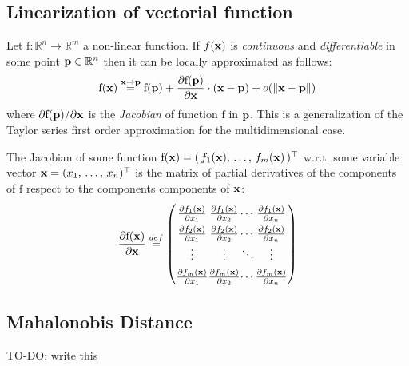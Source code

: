 	\subsection{Linearization of vectorial function}
		\label{app.jacobian}
		Let $\mathrm{f} : \mathbb{R}^n \rightarrow \mathbb{R}^m$ a non-linear function.
		If $f(\boldsymbol{\mathrm{{x}}})$ is \emph{continuous} and \emph{differentiable} in some point $\boldsymbol{\mathrm{{p}}} \in \mathbb{R}^n$ then it can be locally approximated as follows:
		\begin{equation}
			\mathrm{f}(\boldsymbol{\mathrm{{x}}}) \stackrel{\boldsymbol{\mathrm{{x}}} \rightarrow \boldsymbol{\mathrm{{p}}}}{=} \mathrm{f}(\boldsymbol{\mathrm{{p}}}) + \frac{\partial\mathrm{f}(\boldsymbol{\mathrm{{p}}})}{\partial\boldsymbol{\mathrm{{x}}}} \cdot (\boldsymbol{\mathrm{{x}}} - \boldsymbol{\mathrm{{p}}}) + o(\| \boldsymbol{\mathrm{{x}}} - \boldsymbol{\mathrm{{p}}} \|)
		\end{equation}
		where ${\partial\mathrm{f}(\boldsymbol{\mathrm{{p}}})}/{\partial\boldsymbol{\mathrm{{x}}}}$ is the \emph{Jacobian} of function $\mathrm{f}$ in $\boldsymbol{\mathrm{{p}}}$. This is a generalization of the Taylor series first order approximation for the multidimensional case. 
		
		The Jacobian of some function $\mathrm{f}(\boldsymbol{\mathrm{{x}}}) = (\, f_1(\boldsymbol{\mathrm{{x}}}),\, \ldots,\, f_m(\boldsymbol{\mathrm{{x}}}) \,)^\top$ w.r.t. some variable vector $\boldsymbol{\mathrm{{x}}} = (x_1,\, \ldots,\, x_n)^\top$ is the matrix of partial derivatives of the components of $\mathrm{f}$ respect to the components components of $\boldsymbol{\mathrm{{x}}}$:
		\begin{equation}
			\arraycolsep=.1pt\def\arraystretch{1.5}
			\frac{\partial\mathrm{f}(\vect{x})}{\partial\vect{x}} \stackrel{def}{=}
			\left(\begin{array}{cccc}
				\frac{\partial f_1(\vect{x})}{\partial x_1} & \frac{\partial f_1(\vect{x})}{\partial x_2} & \cdots & \frac{\partial f_1(\vect{x})}{\partial x_n} \\
				\frac{\partial f_2(\vect{x})}{\partial x_1} & \frac{\partial f_2(\vect{x})}{\partial x_2} & \cdots & \frac{\partial f_2(\vect{x})}{\partial x_n} \\
				\vdots & \vdots & \ddots & \vdots \\
				\frac{\partial f_m(\vect{x})}{\partial x_1} & \frac{\partial f_m(\vect{x})}{\partial x_2} & \cdots & \frac{\partial f_m(\vect{x})}{\partial x_n} \\
			\end{array}\right)
		\end{equation}
	
	\subsection{Mahalonobis Distance}
		\label{app.mahalonobis}
		TO-DO: write this
	
